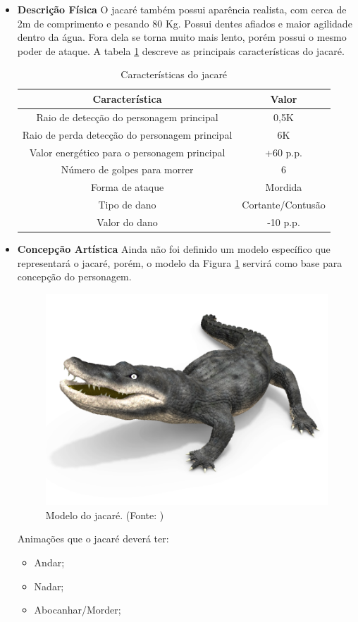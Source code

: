 \begin{itemize}
\item {\bf Descrição Física}
O jacaré também possui aparência realista, com cerca de 2m de comprimento e
 pesando 80 Kg. Possui dentes afiados e maior agilidade dentro da água.
 Fora dela se torna muito mais lento, porém possui o mesmo poder de ataque.
 A tabela \ref{table:jacare} descreve as principais características do jacaré.

\begin{table}[H]
\begin{center}
\begin{tabular}{|c|c|}
\hline 
\textbf{Característica} & \textbf{Valor} \\ 
\hline 
Raio de detecção do personagem principal & 0,5K \\ 
\hline 
Raio de perda detecção do personagem principal & 6K \\ 
\hline 
Valor energético para o personagem principal & +60 p.p. \\ 
\hline 
Número de golpes para morrer & 6 \\ 
\hline 
Forma de ataque & Mordida \\ 
\hline 
Tipo de dano & Cortante/Contusão \\ 
\hline 
Valor do dano & -10 p.p. \\ 
\hline 
\end{tabular} 
\caption{Características do jacaré}
\label{table:jacare}
\end{center}
\end{table}

\item {\bf Concepção Artística}
Ainda não foi definido um modelo específico que representará o jacaré,
 porém, o modelo da Figura \ref{img:jacare} servirá como base para concepção do
 personagem.
\newpage
\begin{figure}[H]
 \centering
 \includegraphics[scale=1]{Imagens/jacare01.png}
 \caption{Modelo do jacaré. (Fonte: \cite{bib:jacare01})}
\label{img:jacare}
\end{figure}

Animações que o jacaré deverá ter:
\begin{itemize}
\item Andar;
\item Nadar;
\item Abocanhar/Morder;
\end{itemize}
\end{itemize}
